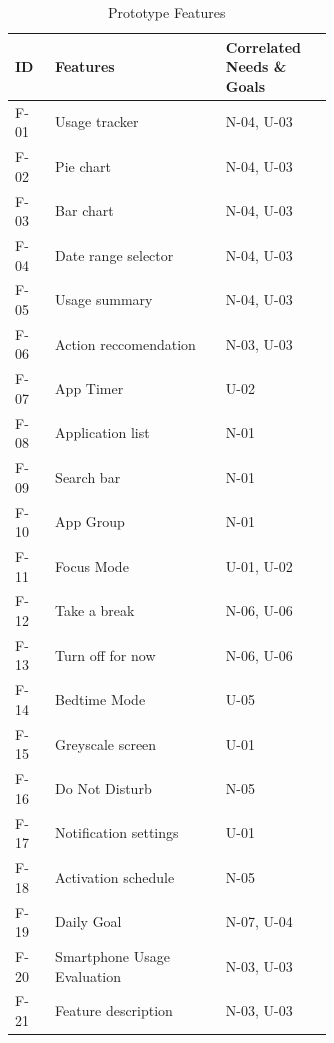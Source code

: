 \documentclass[conference]{IEEEtran}
\begin{document}
\RaggedLeft
\begin{table}[htbp]
  \caption{Prototype Features}
  \begin{footnotesize}
    \begin{center}
      \begin{tabular}{|m{0.07\linewidth}|m{0.4\linewidth}|m{0.16\linewidth}|}
        \hline
      \centering\textbf{ID} & \textbf{Features} & \textbf{Correlated Needs \& Goals}\\ \hline
      \centering F-01 & Usage tracker & N-04, U-03 \\ \hline
      \centering F-02 & Pie chart & N-04, U-03 \\ \hline
      \centering F-03 & Bar chart & N-04, U-03 \\ \hline
      \centering F-04 & Date range selector & N-04, U-03 \\ \hline
      \centering F-05 & Usage summary & N-04, U-03 \\ \hline
      \centering F-06 & Action reccomendation & N-03, U-03 \\ \hline
      \centering F-07 & App Timer & U-02 \\ \hline
      \centering F-08 & Application list & N-01 \\ \hline
      \centering F-09 & Search bar & N-01 \\ \hline
      \centering F-10 & App Group & N-01 \\ \hline
      \centering F-11 & Focus Mode & U-01, U-02 \\ \hline
      \centering F-12 & Take a break & N-06, U-06 \\ \hline
      \centering F-13 & Turn off for now & N-06, U-06 \\ \hline
      \centering F-14 & Bedtime Mode & U-05 \\ \hline
      \centering F-15 & Greyscale screen & U-01 \\ \hline
      \centering F-16 & Do Not Disturb & N-05 \\ \hline
      \centering F-17 & Notification settings & U-01 \\ \hline
      \centering F-18 & Activation schedule & N-05 \\ \hline
      \centering F-19 & Daily Goal & N-07, U-04 \\ \hline
      \centering F-20 & Smartphone Usage Evaluation & N-03, U-03 \\ \hline
      \centering F-21 & Feature description & N-03, U-03 \\ \hline
    \end{tabular}
    \label{tab:features}
  \end{center}
\end{footnotesize}
\end{table}
\justifying
\end{document}
